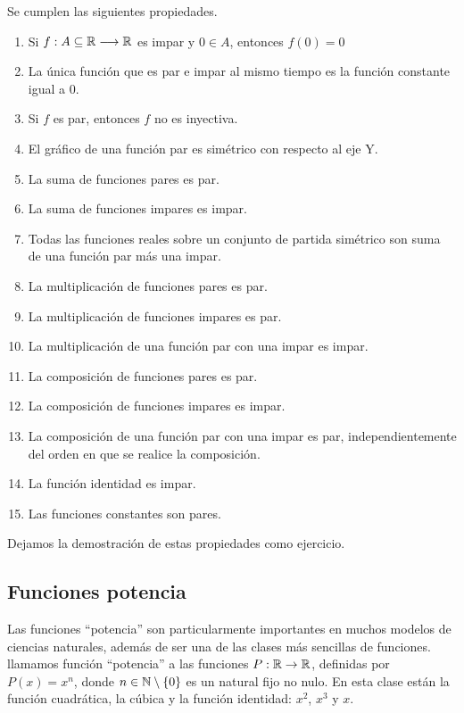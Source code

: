 \vspace{.2cm}

\begin{prop}
Se cumplen las siguientes propiedades.
\begin{enumerate}
	\item Si $f: A\subseteq \mathbb{R} \longrightarrow \mathbb{R}$ es impar y $0\in A$, entonces $f(0)=0$
	\item La única función que es par e impar al mismo tiempo es la función constante igual a 0.
	\item Si $f$ es par, entonces $f$ no es inyectiva.
	\item El gr\'afico de una funci\'on par es sim\'etrico con
		respecto al eje Y.
	\item La suma de funciones pares es par.
	\item La suma de funciones impares es impar.
	\item Todas las funciones reales sobre un conjunto de partida simétrico son suma de una función par más una impar.
	\item La multiplicación de funciones pares es par.
	\item La multiplicación de funciones impares es par.
	\item La multiplicación de una función par con una impar es impar.
	\item La composición de funciones pares es par.
	\item La composición de funciones impares es impar.
	\item La composición de una función par con una impar es par, independientemente del orden en que se realice la composición.	
	\item La función identidad es impar.
	\item Las funciones constantes son pares.
\end{enumerate}
\end{prop}

 
 Dejamos la demostración de estas propiedades como ejercicio.



\subsection{Funciones potencia}

Las funciones ``potencia'' son particularmente importantes en muchos modelos de ciencias naturales, además de ser una de las clases más sencillas de funciones.
llamamos función ``potencia'' a las funciones $P:\mathbb{R}\rightarrow\mathbb{R}$, definidas por $P(x)=x^n$, donde $n\in\mathbb{N}\setminus\{0\}$ es un natural fijo no nulo.
En esta clase están la función cuadrática, la cúbica y la función identidad: $x^2$, $x^3$ y $x$.


